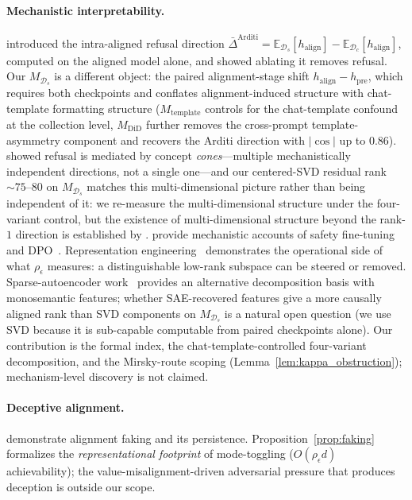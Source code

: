\documentclass[10pt]{article}
\theoremstyle{definition}
\theoremstyle{remark}
\begin{document}
\paragraph{Mechanistic interpretability.}
\citet{arditi2024refusal} introduced the intra-aligned
refusal direction $\bar{\Delta}^{\mathrm{Arditi}} =
\mathbb{E}_{\mathcal{D}_s}[h_{\mathrm{align}}] -
\mathbb{E}_{\mathcal{D}_c}[h_{\mathrm{align}}]$,
computed on the aligned model alone, and showed
ablating it removes refusal.  Our $M_{\mathcal{D}_s}$
is a different object: the paired alignment-stage shift
$h_{\mathrm{align}} - h_{\mathrm{pre}}$, which requires
both checkpoints and conflates alignment-induced
structure with chat-template formatting structure
($M_{\mathrm{template}}$ controls for the chat-template
confound at the collection level, $M_{\mathrm{DiD}}$
further removes the cross-prompt template-asymmetry
component and recovers the Arditi direction with
$|\cos|$ up to $0.86$).
\citet{wollschlager2025} showed refusal is mediated by
concept \emph{cones}---multiple mechanistically
independent directions, not a single one---and our
centered-SVD residual rank $\sim 75$--$80$ on
$M_{\mathcal{D}_s}$ matches this multi-dimensional
picture rather than being independent of it: we
re-measure the multi-dimensional structure under the
four-variant control, but the existence of
multi-dimensional structure beyond the rank-$1$
direction is established by \citet{wollschlager2025}.
\citet{jain2024what, lee2024mechanistic} provide
mechanistic accounts of safety fine-tuning and
DPO~\citep{rafailov2023dpo}.
Representation engineering~\citep{zou2023representation,
turner2023steering} demonstrates the operational
side of what $\rho_{\epsilon}$ measures: a
distinguishable low-rank subspace can be steered or
removed.  Sparse-autoencoder
work~\citep{templeton2024scaling} provides an
alternative decomposition basis with monosemantic
features; whether SAE-recovered features give a more
causally aligned rank than SVD components on
$M_{\mathcal{D}_s}$ is a natural open question (we use
SVD because it is sub-capable computable from paired
checkpoints alone).
Our contribution is the formal index, the
chat-template-controlled four-variant decomposition,
and the Mirsky-route scoping
(Lemma~\ref{lem:kappa_obstruction}); mechanism-level
discovery is not claimed.

\paragraph{Deceptive alignment.}
\citet{greenblatt2024alignment, hubinger2024sleeper}
demonstrate alignment faking and its persistence.
Proposition~\ref{prop:faking} formalizes the
\emph{representational footprint} of mode-toggling
($O(\rho_{\epsilon} d)$ achievability);
the value-misalignment-driven adversarial pressure
that produces deception is outside our scope.
\end{document}
